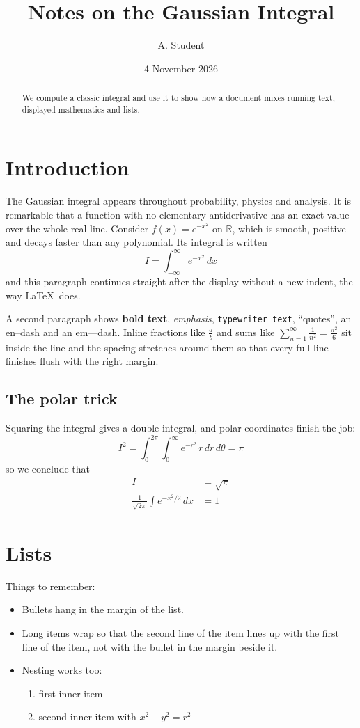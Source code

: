 \documentclass[11pt]{article}
\title{Notes on the Gaussian Integral}
\author{A. Student}
\date{4 November 2026}
\newcommand{\R}{\mathbb{R}}
\begin{document}
\maketitle
\begin{abstract}
We compute a classic integral and use it to show how a document mixes running text, displayed mathematics and lists.
\end{abstract}

\section{Introduction}
The Gaussian integral appears throughout probability, physics and analysis. It is remarkable that a function with no elementary antiderivative has an exact value over the whole real line. Consider $f(x) = e^{-x^2}$ on $\R$, which is smooth, positive and decays faster than any polynomial. Its integral is written
\[ I = \int_{-\infty}^{\infty} e^{-x^2}\,dx \]
and this paragraph continues straight after the display without a new indent, the way \LaTeX\ does.

A second paragraph shows \textbf{bold text}, \emph{emphasis}, \texttt{typewriter text}, ``quotes'', an en--dash and an em---dash. Inline fractions like $\frac{a}{b}$ and sums like $\sum_{n=1}^{\infty} \frac{1}{n^2} = \frac{\pi^2}{6}$ sit inside the line and the spacing stretches around them so that every full line finishes flush with the right margin.

\subsection{The polar trick}
Squaring the integral gives a double integral, and polar coordinates finish the job:
\begin{equation}
I^2 = \int_0^{2\pi}\!\!\int_0^\infty e^{-r^2}\, r\,dr\,d\theta = \pi
\end{equation}
so we conclude that
\begin{align*}
I &= \sqrt{\pi} \\
\frac{1}{\sqrt{2\pi}}\int e^{-x^2/2}\,dx &= 1
\end{align*}

\section{Lists}
Things to remember:
\begin{itemize}
\item Bullets hang in the margin of the list.
\item Long items wrap so that the second line of the item lines up with the first line of the item, not with the bullet in the margin beside it.
\item Nesting works too:
  \begin{enumerate}
  \item first inner item
  \item second inner item with $x^2 + y^2 = r^2$
  \end{enumerate}
\end{itemize}
\end{document}
